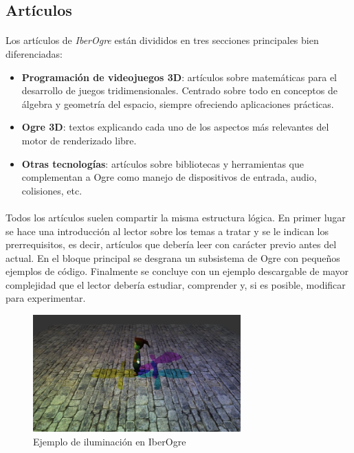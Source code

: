 \documentclass[16pt,spanish]{article}
\def \wiki{\emph{IberOgre} }
\begin{document}
\subsection{Artículos}

\paragraph{}
Los artículos de \wiki están divididos en tres secciones principales bien
diferenciadas:

\begin{itemize}
    \item \textbf{Programación de videojuegos 3D}: artículos sobre matemáticas
    para el desarrollo de juegos tridimensionales. Centrado sobre todo en
    conceptos de álgebra y geometría del espacio, siempre ofreciendo aplicaciones
    prácticas.
    \item \textbf{Ogre 3D}: textos explicando cada uno de los aspectos más
    relevantes del motor de renderizado libre.
    \item \textbf{Otras tecnologías}: artículos sobre bibliotecas y herramientas
    que complementan a Ogre como manejo de dispositivos de entrada, audio,
    colisiones, etc.
\end{itemize}

\paragraph{}
Todos los artículos suelen compartir la misma estructura lógica. En primer
lugar se hace una introducción al lector sobre los temas a tratar y se
le indican los prerrequisitos, es decir, artículos que debería leer con
carácter previo antes del actual. En el bloque principal se desgrana
un subsistema de Ogre con pequeños ejemplos de código. Finalmente se concluye
con un ejemplo descargable de mayor complejidad que el lector debería
estudiar, comprender y, si es posible, modificar para experimentar.

\begin{figure}[H]
    \centering
        \includegraphics[width=8cm]{img/iluminacion-iberogre.jpg} 
    \caption{Ejemplo de iluminación en IberOgre}
    \label{img:iluminacion-iberogre}
\end{figure}
\end{document}
